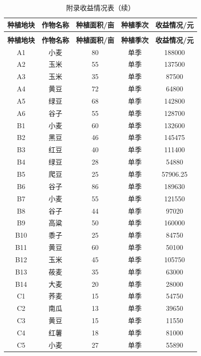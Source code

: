 \begin{longtable}{ccccc}
\caption{附录收益情况表}\label{tbl:c063-015}\\
\toprule
\textbf{种植地块} & \textbf{作物名称} & \textbf{种植面积/亩} & \textbf{种植季次} & \textbf{收益情况/元} \\
\midrule
\endfirsthead
\caption[]{附录收益情况表（续）}\\
\toprule
\textbf{种植地块} & \textbf{作物名称} & \textbf{种植面积/亩} & \textbf{种植季次} & \textbf{收益情况/元} \\
\midrule
\endhead
A1 & 小麦 & 80 & 单季 & 188000 \\
A2 & 玉米 & 55 & 单季 & 137500 \\
A3 & 玉米 & 35 & 单季 & 87500 \\
A4 & 黄豆 & 72 & 单季 & 64800 \\
A5 & 绿豆 & 68 & 单季 & 142800 \\
A6 & 谷子 & 55 & 单季 & 128700 \\
B1 & 小麦 & 60 & 单季 & 132600 \\
B2 & 黑豆 & 46 & 单季 & 145475 \\
B3 & 红豆 & 40 & 单季 & 111400 \\
B4 & 绿豆 & 28 & 单季 & 54880 \\
B5 & 爬豆 & 25 & 单季 & 57906.25 \\
B6 & 谷子 & 86 & 单季 & 189630 \\
B7 & 小麦 & 55 & 单季 & 121550 \\
B8 & 谷子 & 44 & 单季 & 97020 \\
B9 & 高粱 & 50 & 单季 & 160000 \\
B10 & 黍子 & 25 & 单季 & 84750 \\
B11 & 黄豆 & 60 & 单季 & 50100 \\
B12 & 玉米 & 45 & 单季 & 105750 \\
B13 & 莜麦 & 35 & 单季 & 63000 \\
B14 & 大麦 & 20 & 单季 & 28000 \\
C1 & 荞麦 & 15 & 单季 & 54750 \\
C2 & 南瓜 & 13 & 单季 & 39650 \\
C3 & 黄豆 & 15 & 单季 & 11550 \\
C4 & 红薯 & 18 & 单季 & 81000 \\
C5 & 小麦 & 27 & 单季 & 55890 \\

\end{longtable}
